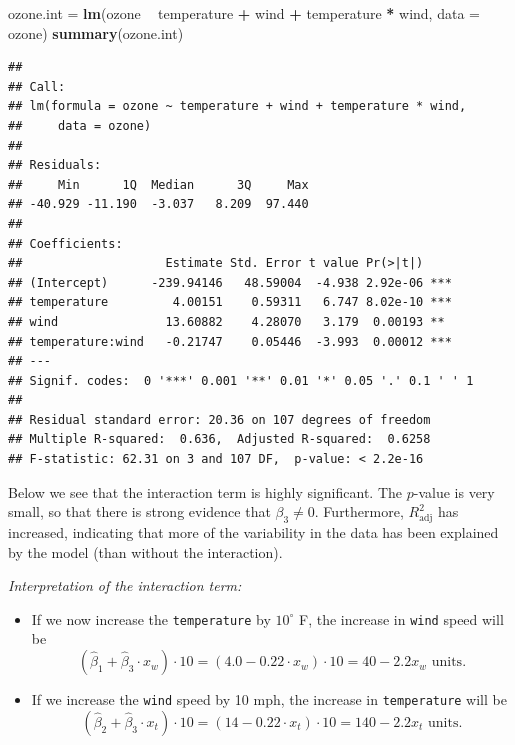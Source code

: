 \documentclass[10pt,ignorenonframetext,]{beamer}
\newenvironment{Shaded}{\begin{snugshade}}{\end{snugshade}}
\newcommand{\KeywordTok}[1]{\textcolor[rgb]{0.13,0.29,0.53}{\textbf{#1}}}
\newcommand{\DataTypeTok}[1]{\textcolor[rgb]{0.13,0.29,0.53}{#1}}
\newcommand{\StringTok}[1]{\textcolor[rgb]{0.31,0.60,0.02}{#1}}
\newcommand{\OperatorTok}[1]{\textcolor[rgb]{0.81,0.36,0.00}{\textbf{#1}}}
\newcommand{\NormalTok}[1]{#1}
\begin{document}
\begin{frame}[fragile]

\footnotesize

\begin{Shaded}
\begin{Highlighting}[]
\NormalTok{ozone.int =}\StringTok{ }\KeywordTok{lm}\NormalTok{(ozone }\OperatorTok{~}\StringTok{ }\NormalTok{temperature }\OperatorTok{+}\StringTok{ }\NormalTok{wind }\OperatorTok{+}\StringTok{ }\NormalTok{temperature }\OperatorTok{*}\StringTok{ }\NormalTok{wind, }\DataTypeTok{data =}\NormalTok{ ozone)}
\KeywordTok{summary}\NormalTok{(ozone.int)}
\end{Highlighting}
\end{Shaded}

\begin{verbatim}
## 
## Call:
## lm(formula = ozone ~ temperature + wind + temperature * wind, 
##     data = ozone)
## 
## Residuals:
##     Min      1Q  Median      3Q     Max 
## -40.929 -11.190  -3.037   8.209  97.440 
## 
## Coefficients:
##                    Estimate Std. Error t value Pr(>|t|)    
## (Intercept)      -239.94146   48.59004  -4.938 2.92e-06 ***
## temperature         4.00151    0.59311   6.747 8.02e-10 ***
## wind               13.60882    4.28070   3.179  0.00193 ** 
## temperature:wind   -0.21747    0.05446  -3.993  0.00012 ***
## ---
## Signif. codes:  0 '***' 0.001 '**' 0.01 '*' 0.05 '.' 0.1 ' ' 1
## 
## Residual standard error: 20.36 on 107 degrees of freedom
## Multiple R-squared:  0.636,  Adjusted R-squared:  0.6258 
## F-statistic: 62.31 on 3 and 107 DF,  p-value: < 2.2e-16
\end{verbatim}

\normalsize

\end{frame}

\begin{frame}

Below we see that the interaction term is highly significant. The
\(p\)-value is very small, so that there is strong evidence that
\(\beta_3 \neq 0\). Furthermore, \(R^2_{\text{adj}}\) has increased,
indicating that more of the variability in the data has been explained
by the model (than without the interaction).

\end{frame}

\begin{frame}[fragile]

\emph{Interpretation of the interaction term:}

\begin{itemize}
\item
  If we now increase the \texttt{temperature} by \(10^{\circ}\) F, the
  increase in \texttt{wind} speed will be
  \[(\hat \beta_1+\hat \beta_3 \cdot x_w) \cdot 10 = (4.0 -0.22 \cdot x_w) \cdot 10 = 40-2.2 x_w \text{ units}.\]
\item
  If we increase the \texttt{wind} speed by 10 mph, the increase in
  \texttt{temperature} will be
  \[(\hat \beta_2 + \hat \beta_3 \cdot x_t) \cdot 10 = (14 -0.22 \cdot x_t) \cdot 10 = 140-2.2 x_t \text{ units}.\]
\end{itemize}

\end{frame}
\end{document}
